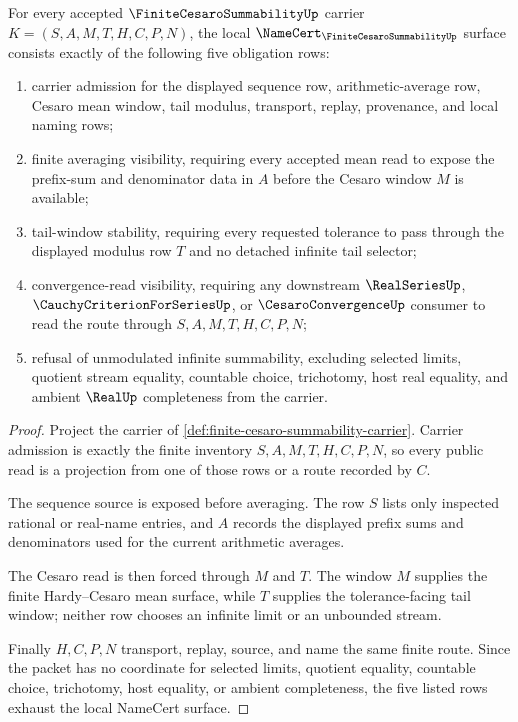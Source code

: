 \begin{theorem}
\label{thm:finite-cesaro-summability-namecert-obligations}
For every accepted $\FiniteCesaroSummabilityUp$ carrier $K=(S,A,M,T,H,C,P,N)$, the local $\NameCert_{\FiniteCesaroSummabilityUp}$ surface consists exactly of the following five obligation rows:
\begin{enumerate}
\item carrier admission for the displayed sequence row, arithmetic-average row, Cesaro mean window, tail modulus, transport, replay, provenance, and local naming rows;
\item finite averaging visibility, requiring every accepted mean read to expose the prefix-sum and denominator data in $A$ before the Cesaro window $M$ is available;
\item tail-window stability, requiring every requested tolerance to pass through the displayed modulus row $T$ and no detached infinite tail selector;
\item convergence-read visibility, requiring any downstream $\RealSeriesUp$, $\CauchyCriterionForSeriesUp$, or $\CesaroConvergenceUp$ consumer to read the route through $S,A,M,T,H,C,P,N$;
\item refusal of unmodulated infinite summability, excluding selected limits, quotient stream equality, countable choice, trichotomy, host real equality, and ambient $\RealUp$ completeness from the carrier.
\end{enumerate}
\end{theorem}
\begin{proof}
Project the carrier of \autoref{def:finite-cesaro-summability-carrier}. Carrier admission is exactly the finite inventory $S,A,M,T,H,C,P,N$, so every public read is a projection from one of those rows or a route recorded by $C$.

The sequence source is exposed before averaging. The row $S$ lists only inspected rational or real-name entries, and $A$ records the displayed prefix sums and denominators used for the current arithmetic averages.

The Cesaro read is then forced through $M$ and $T$. The window $M$ supplies the finite Hardy--Cesaro mean surface, while $T$ supplies the tolerance-facing tail window; neither row chooses an infinite limit or an unbounded stream.

Finally $H,C,P,N$ transport, replay, source, and name the same finite route. Since the packet has no coordinate for selected limits, quotient equality, countable choice, trichotomy, host equality, or ambient completeness, the five listed rows exhaust the local NameCert surface.
\end{proof}

